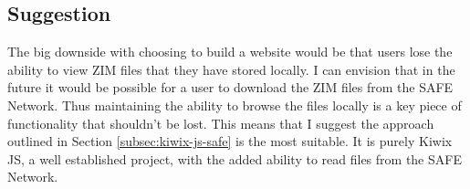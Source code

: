 \subsection{Suggestion}

The big downside with choosing to build a website would be that users lose the ability to view ZIM files that they have stored locally. I can envision that in the future it would be possible for a user to download the ZIM files from the SAFE Network. Thus maintaining the ability to browse the files locally is a key piece of functionality that shouldn't be lost. This means that I suggest the approach outlined in Section \ref{subsec:kiwix-js-safe} is the most suitable. It is purely Kiwix JS, a well established project, with the added ability to read files from the SAFE Network.







